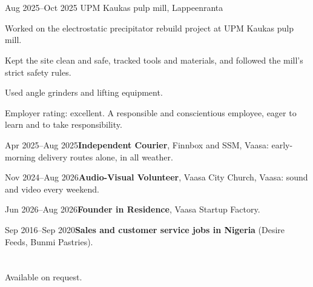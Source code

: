 \documentclass[a4paper,11pt]{article}
\begin{document}
\section{}
\begin{cventry}{Aug 2025--Oct 2025}{}
  UPM Kaukas pulp mill, Lappeenranta\par
  Worked on the electrostatic precipitator rebuild project at UPM Kaukas pulp mill.\par
  Kept the site clean and safe, tracked tools and materials, and followed the mill's strict safety rules.\par
  Used angle grinders and lifting equipment.\par
  Employer rating: excellent. A responsible and conscientious employee, eager to learn and to take responsibility.
\end{cventry}
\begin{cventry}{Apr 2025--Aug 2025}{\textbf{Independent Courier}, Finnbox and SSM, Vaasa: early-morning delivery routes alone, in all weather.}
\end{cventry}
\begin{cventry}{Nov 2024--Aug 2026}{\textbf{Audio-Visual Volunteer}, Vaasa City Church, Vaasa: sound and video every weekend.}
\end{cventry}
\begin{cventry}{Jun 2026--Aug 2026}{\textbf{Founder in Residence}, Vaasa Startup Factory.}
\end{cventry}
\begin{cventry}{Sep 2016--Sep 2020}{\textbf{Sales and customer service jobs in Nigeria} (Desire Feeds, Bunmi Pastries).}
\end{cventry}

\section{}

\section{}
Available on request.
\end{document}
